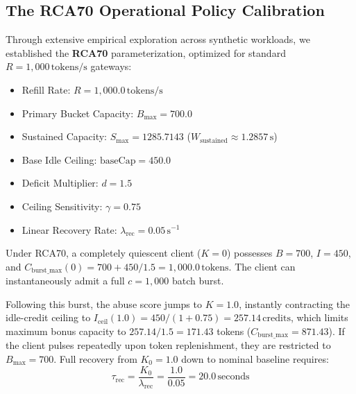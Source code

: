 \documentclass[conference]{IEEEtran}
\begin{document}
\subsection{The RCA70 Operational Policy Calibration}
Through extensive empirical exploration across synthetic workloads, we established the \textbf{RCA70} parameterization, optimized for standard $R = 1,000\,\text{tokens/s}$ gateways:
\begin{itemize}
    \item Refill Rate: $R = 1,000.0\,\text{tokens/s}$
    \item Primary Bucket Capacity: $B_{\max} = 700.0$
    \item Sustained Capacity: $S_{\max} = 1285.7143$ ($W_{\text{sustained}} \approx 1.2857\,\text{s}$)
    \item Base Idle Ceiling: $\text{baseCap} = 450.0$
    \item Deficit Multiplier: $d = 1.5$
    \item Ceiling Sensitivity: $\gamma = 0.75$
    \item Linear Recovery Rate: $\lambda_{\text{rec}} = 0.05\,\text{s}^{-1}$
\end{itemize}

Under RCA70, a completely quiescent client ($K = 0$) possesses $B = 700$, $I = 450$, and $C_{\text{burst\_max}}(0) = 700 + 450/1.5 = 1,000.0\,\text{tokens}$. The client can instantaneously admit a full $c = 1,000$ batch burst. 

Following this burst, the abuse score jumps to $K = 1.0$, instantly contracting the idle-credit ceiling to $I_{\text{ceil}}(1.0) = 450 / (1 + 0.75) = 257.14\,\text{credits}$, which limits maximum bonus capacity to $257.14 / 1.5 = 171.43$ tokens ($C_{\text{burst\_max}} = 871.43$). If the client pulses repeatedly upon token replenishment, they are restricted to $B_{\max} = 700$. Full recovery from $K_0 = 1.0$ down to nominal baseline requires:
\begin{equation}
\tau_{\text{rec}} = \frac{K_0}{\lambda_{\text{rec}}} = \frac{1.0}{0.05} = 20.0\,\text{seconds}
\end{equation}
\end{document}
